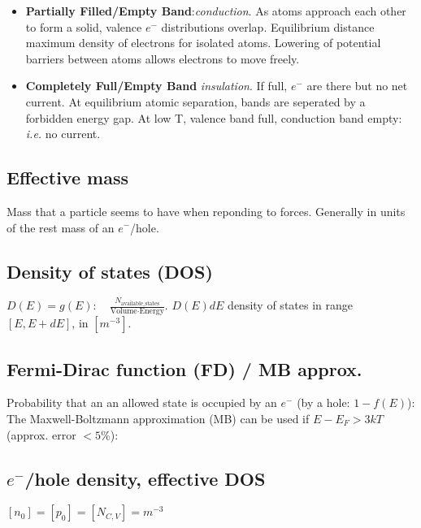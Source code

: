 \documentclass[a4paper, fontsize=8pt, landscape, DIV=1]{scrartcl}
\begin{document}
\begin{multicols*}{4}
\begin{itemize}[noitemsep,nolistsep]
  \item\textbf{Partially Filled/Empty Band}:\textit{conduction}. As atoms approach each other to form a solid, valence $e^-$ distributions overlap. Equilibrium distance ~ maximum density of electrons for isolated atoms. Lowering of potential barriers between atoms allows electrons to move freely.

  \item\textbf{Completely Full/Empty Band} \textit{insulation}. If full, $e^-$ are there but no net current. At equilibrium atomic separation, bands are seperated by a forbidden energy gap. At low T, valence band full, conduction band empty: \textit{i.e.} no current.
\end{itemize}
\subsection{Effective mass}
Mass that a particle seems to have when reponding to forces. Generally in units of the rest mass of an $e^-$/hole.
\subsection{Density of states (DOS)}
$D(E)=g(E):\quad \frac{N_\text{available\_states}}{\text{Volume}\cdot\text{Energy}}$. $D(E)dE$ density of states in range $[E,E+dE]$, in $[m^{-3}]$.

\subsection{Fermi-Dirac function (FD) / MB approx.}
Probability that an an allowed  state is occupied by an $e^-$ (by a hole: $1-f(E)$): 
The Maxwell-Boltzmann approximation (MB) can be used if $E-E_F>3kT$ (approx. error $<5\%$):

\subsection{$e^-$/hole density, effective DOS}\label{n0p0}
$[n_0]=[p_0]=[N_{C,V}]=m^{-3}$

\end{multicols*}
\end{document}
